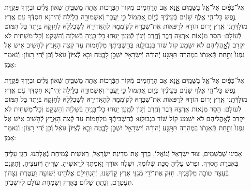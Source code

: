 \documentclass[twoside, openany, parskip=half, 11pt]{book}
\begin{document}
אֶל־כַּפָּ֔יִם אֶל־אֵ֖ל בַּשָּׁמָֽיִם׃ אׇׇָנָּא אָב הָרַחֲמִים מְֿקוֹר הַבְּֿרָכוֹת אַתָּה מַשְׁבִּֽיחַ שְֿׁאוֹן גַּלִּים וּבְיָדְךָ פְּֿקֻדַּת נֶ֣פֶשׁ כׇּל־חָ֑י אֶ֢לֶף שָׁנִ֡ים בְּֽֿעֵינֶ֗יךָ כְּֿי֣וֹם אֶ֭תְמוֹל כִּ֣י יַֽעֲבֹ֑ר וְֿאַשְׁמוּרָ֥ה בַלָּֽיְֿלָה׃ יְֿהִי־נָא חַסְדְּֿךָ עִם אֶֽרֶץ מוֹלַדְּֿתֵּֽנוּ אֶֽרֶץ
יָרוּם הוֹדָהּ לְֿרַפּאוֹת אֶת־שִׁבְרָהּ לְֿקוֹמֲמָהּ לְֿהַאֲדִירָהּ לְֿשַׁכְלְֿלָהּ לְֿחַזְּֿקָהּ בְּֿיָתֵד בַּל תִּמּוֹט לְֿעוֹלָם: הָסֵר מִנְּֿאוֹת אַרְצָהּ דֶּֽבֶר וְֿחֶֽרֶב וְֿיָגוֹן לְֿמַֽעַן יָנֽוּחוּ כׇל־בָּנֶֽיהָ בְּֿשַׁלְוָה וְֿהַשְׁקֵט וְֿכׇל־מַשְׁחִית לֹא יִקְרַב לְֿאׇׇׇׇׇׇׇָהֳלֵיהֶם לֹא יִשָּׁמַע קוֹל שׁוֹד בִּגְבוּלֵֽנוּ: בְּֿהַשְׁבִּיתְֿךָ מִלְחָמוֹת עַד קְֿצֵה הָאָֽרֶץ לְֿהָשִׁיב אִישׁ אֶל גַּפְנוֹ֙ וְתַ֣חַת תְּֿאֵֽנָת֔וֹ׃ בִּמְהֵרָה תִּוָּשַׁ֣ע יְֿהוּדָ֔ה וְֿיִשְׂרָאֵ֖ל יִשְׁכֹּ֣ן לָבֶ֑טַח וּבָ֤א לְֿצִיּוֹן֙ גּוֹאֵ֔ל וְֿכֵן יְֿהִי רָצוֹן: וְֿנֹאמַר אָמֵן:



אֶל־כַּפָּ֔יִם אֶל־אֵ֖ל בַּשָּׁמָֽיִם׃ אׇׇָנָּא אָב הָרַחֲמִים מְֿקוֹר הַבְּֿרָכוֹת אַתָּה מַשְׁבִּֽיחַ שְֿׁאוֹן גַּלִּים וּבְיָדְךָ פְּֿקֻדַּת נֶ֣פֶשׁ כׇּל־חָ֑י אֶ֢לֶף שָׁנִ֡ים בְּֽֿעֵינֶ֗יךָ כְּֿי֣וֹם אֶ֭תְמוֹל כִּ֣י יַֽעֲבֹ֑ר וְֿאַשְׁמוּרָ֥ה בַלָּֽיְֿלָה׃ יְֿהִי־נָא חַסְדְּֿךָ עִם אֶֽרֶץ מוֹלַדְּֿתֵּֽנוּ אֶֽרֶץ
יָרוּם הוֹדָהּ לְֿרַפּאוֹת אֶת־שִׁבְרָהּ לְֿקוֹמֲמָהּ לְֿהַאֲדִירָהּ לְֿשַׁכְלְֿלָהּ לְֿחַזְּֿקָהּ בְּֿיָתֵד בַּל תִּמּוֹט לְֿעוֹלָם: הָסֵר מִנְּֿאוֹת אַרְצָהּ דֶּֽבֶר וְֿחֶֽרֶב וְֿיָגוֹן לְֿמַֽעַן יָנֽוּחוּ כׇל־בָּנֶֽיהָ בְּֿשַׁלְוָה וְֿהַשְׁקֵט וְֿכׇל־מַשְׁחִית לֹא יִקְרַב לְֿאׇׇׇׇׇׇׇָהֳלֵיהֶם לֹא יִשָּׁמַע קוֹל שׁוֹד בִּגְבוּלֵֽנוּ: בְּֿהַשְׁבִּיתְֿךָ מִלְחָמוֹת עַד קְֿצֵה הָאָֽרֶץ לְֿהָשִׁיב אִישׁ אֶל גַּפְנוֹ֙ וְתַ֣חַת תְּֿאֵֽנָת֔וֹ׃ בִּמְהֵרָה תִּוָּשַׁ֣ע יְֿהוּדָ֔ה וְֿיִשְׂרָאֵ֖ל יִשְׁכֹּ֣ן לָבֶ֑טַח וּבָ֤א לְֿצִיּוֹן֙ גּוֹאֵ֔ל וְֿכֵן יְֿהִי רָצוֹן: וְֿנֹאמַר אָמֵן:



אָבִינוּ שֶׁבַּשָּׁמַיִם, צוּר יִשְׂרָאֵל וְֿגוֹאֲלוֹ, בָּרֵךְ אֶת־מְדִינַת יִשְׂרָאֵל, רֵאשִׁית צְֿמִיחַת גְּֿאֻלָּתֵנוּ. הָגֵן עָלֶיהָ בְּֿאֶבְרַת חַסְדֶּךָ, וּפְרֹשׁ עָלֶיהָ סֻכַּת שְֿׁלוֹמֶךָ, וּשְׁלַח אוֹרְֿךָ וַאֲמִתְּךָ לְֿרָאשֶׁיהָ, שָׂרֶיהָ וְֿיוֹעֲצֶיהָ, וְֿתַקְּנֵם בְּֿעֵצָה טוֹבָה מִלְּפָנֶיךָ. חַזֵּק אֶת־יְֿדֵי מְֿגִנֵּי אֶרֶץ קָדְֿשֵׁנוּ, וְֿהַנְחִילֵם אֱלֹהֵינוּ יְֿשׁוּעָה וַעֲטֶרֶת נִצָּחוֹן תְּֿעַטְּרֵם, וְֿנָתַתָּ שָׁלוֹם בָּאָרֶץ וְֿשִׂמְחַת עוֹלָם לְֿיוֹשְֿׁבֶיהָ.
\end{document}

